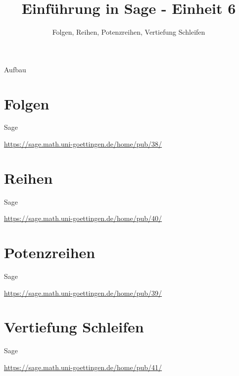 \documentclass[hyperref={xetex}]{beamer}
\title{Einführung in Sage - Einheit 6}
\subtitle{Folgen, Reihen, Potenzreihen, Vertiefung Schleifen}
\begin{document}
\titlepage

\begin{frame}{Aufbau}
\tableofcontents
\end{frame}

\section{Folgen}


\begin{frame}{Sage}
    \begin{center}
        \url{https://sage.math.uni-goettingen.de/home/pub/38/}
    \end{center}
\end{frame}


\section{Reihen}


\begin{frame}{Sage}
    \begin{center}
        \url{https://sage.math.uni-goettingen.de/home/pub/40/}
    \end{center}
\end{frame}

\section{Potenzreihen}


\begin{frame}{Sage}
    \begin{center}
        \url{https://sage.math.uni-goettingen.de/home/pub/39/}
    \end{center}
\end{frame}


\section{Vertiefung Schleifen}

\begin{frame}{Sage}
    \begin{center}
        \url{https://sage.math.uni-goettingen.de/home/pub/41/}
    \end{center}
\end{frame}


\end{document}
